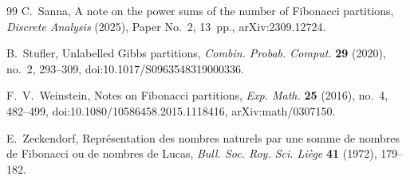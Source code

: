 \begin{thebibliography}{99}
C.~Sanna,
A note on the power sums of the number of Fibonacci partitions,
\textit{Discrete Analysis} (2025), Paper No.~2, 13~pp.,
arXiv:2309.12724.

B.~Stufler,
Unlabelled Gibbs partitions,
\textit{Combin. Probab. Comput.} \textbf{29} (2020), no.~2, 293--309,
doi:10.1017/S0963548319000336.

F.~V.~Weinstein,
Notes on Fibonacci partitions,
\textit{Exp. Math.} \textbf{25} (2016), no.~4, 482--499,
doi:10.1080/10586458.2015.1118416, arXiv:math/0307150.

E.~Zeckendorf,
Repr\'esentation des nombres naturels par une somme de nombres de Fibonacci ou
de nombres de Lucas,
\textit{Bull. Soc. Roy. Sci. Li\`ege} \textbf{41} (1972), 179--182.

\end{thebibliography}
